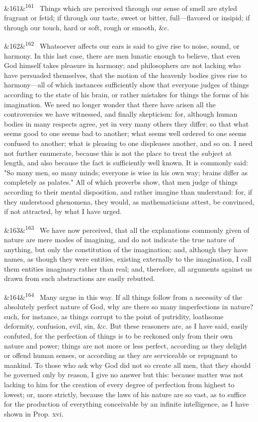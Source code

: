 \documentclass[12pt]{article}
\newcommand{\para}[1][]{\par\noindent\ifx&#1&\else\textsuperscript{\footnotesize #1}~\fi}
\begin{document}
\para[161] Things which are perceived through our sense of smell are styled fragrant or fetid; if through our taste, sweet or bitter, full---flavored or insipid; if through our touch, hard or soft, rough or smooth, \&c.

\para[162] Whatsoever affects our ears is said to give rise to noise, sound, or harmony. In this last case, there are men lunatic enough to believe, that even God himself takes pleasure in harmony; and philosophers are not lacking who have persuaded themselves, that the motion of the heavenly bodies gives rise to harmony---all of which instances sufficiently show that everyone judges of things according to the state of his brain, or rather mistakes for things the forms of his imagination. We need no longer wonder that there have arisen all the controversies we have witnessed, and finally skepticism: for, although human bodies in many respects agree, yet in very many others they differ; so that what seems good to one seems bad to another; what seems well ordered to one seems confused to another; what is pleasing to one displeases another, and so on. I need not further enumerate, because this is not the place to treat the subject at length, and also because the fact is sufficiently well known. It is commonly said: "So many men, so many minds; everyone is wise in his own way; brains differ as completely as palates." All of which proverbs show, that men judge of things according to their mental disposition, and rather imagine than understand: for, if they understood phenomena, they would, as mathematicians attest, be convinced, if not attracted, by what I have urged.

\para[163] We have now perceived, that all the explanations commonly given of nature are mere modes of imagining, and do not indicate the true nature of anything, but only the constitution of the imagination; and, although they have names, as though they were entities, existing externally to the imagination, I call them entities imaginary rather than real; and, therefore, all arguments against us drawn from such abstractions are easily rebutted.

\para[164] Many argue in this way. If all things follow from a necessity of the absolutely perfect nature of God, why are there so many imperfections in nature? such, for instance, as things corrupt to the point of putridity, loathsome deformity, confusion, evil, sin, \&c. But these reasoners are, as I have said, easily confuted, for the perfection of things is to be reckoned only from their own nature and power; things are not more or less perfect, according as they delight or offend human senses, or according as they are serviceable or repugnant to mankind. To those who ask why God did not so create all men, that they should be governed only by reason, I give no answer but this: because matter was not lacking to him for the creation of every degree of perfection from highest to lowest; or, more strictly, because the laws of his nature are so vast, as to suffice for the production of everything conceivable by an infinite intelligence, as I have shown in Prop. xvi.
\end{document}
